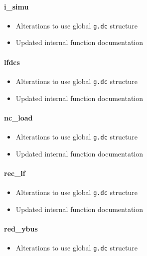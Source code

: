 \documentclass[12pt]{article}
\begin{document}
\paragraph{i\_simu}
	\begin{itemize}
		\item Alterations to use global \verb|g.dc| structure
		\item Updated internal function documentation
	\end{itemize}

\paragraph{lfdcs}
	\begin{itemize}
		\item Alterations to use global \verb|g.dc| structure
		\item Updated internal function documentation
	\end{itemize}

\paragraph{nc\_load}
	\begin{itemize}
		\item Alterations to use global \verb|g.dc| structure
		\item Updated internal function documentation
	\end{itemize}
\paragraph{rec\_lf}
	\begin{itemize}
		\item Alterations to use global \verb|g.dc| structure
		\item Updated internal function documentation
	\end{itemize}
\paragraph{red\_ybus}
	\begin{itemize}
		\item Alterations to use global \verb|g.dc| structure
	\end{itemize}
\end{document}
